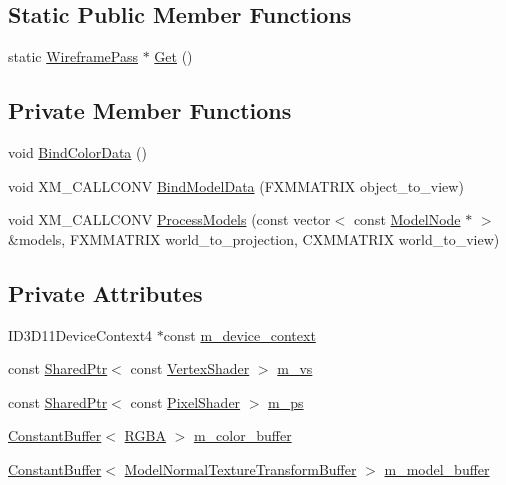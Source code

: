 \subsection*{Static Public Member Functions}
\begin{DoxyCompactItemize}
\item 
static \hyperlink{classmage_1_1_wireframe_pass}{Wireframe\+Pass} $\ast$ \hyperlink{classmage_1_1_wireframe_pass_ace5168eac9d32c1bfa71df3411960f48}{Get} ()
\end{DoxyCompactItemize}
\subsection*{Private Member Functions}
\begin{DoxyCompactItemize}
\item 
void \hyperlink{classmage_1_1_wireframe_pass_a574897c1274585057e8d44070409b7e3}{Bind\+Color\+Data} ()
\item 
void X\+M\+\_\+\+C\+A\+L\+L\+C\+O\+NV \hyperlink{classmage_1_1_wireframe_pass_a6e316eaabf3afb71162490c1f3c244f3}{Bind\+Model\+Data} (F\+X\+M\+M\+A\+T\+R\+IX object\+\_\+to\+\_\+view)
\item 
void X\+M\+\_\+\+C\+A\+L\+L\+C\+O\+NV \hyperlink{classmage_1_1_wireframe_pass_a190f6a6a916949b6b37d5b70c9451008}{Process\+Models} (const vector$<$ const \hyperlink{classmage_1_1_model_node}{Model\+Node} $\ast$ $>$ \&models, F\+X\+M\+M\+A\+T\+R\+IX world\+\_\+to\+\_\+projection, C\+X\+M\+M\+A\+T\+R\+IX world\+\_\+to\+\_\+view)
\end{DoxyCompactItemize}
\subsection*{Private Attributes}
\begin{DoxyCompactItemize}
\item 
I\+D3\+D11\+Device\+Context4 $\ast$const \hyperlink{classmage_1_1_wireframe_pass_ac0f6bc1488ab515fe00d6e7abf230636}{m\+\_\+device\+\_\+context}
\item 
const \hyperlink{namespacemage_a1e01ae66713838a7a67d30e44c67703e}{Shared\+Ptr}$<$ const \hyperlink{classmage_1_1_vertex_shader}{Vertex\+Shader} $>$ \hyperlink{classmage_1_1_wireframe_pass_aa55de3b804055362812bcf775e0dffb4}{m\+\_\+vs}
\item 
const \hyperlink{namespacemage_a1e01ae66713838a7a67d30e44c67703e}{Shared\+Ptr}$<$ const \hyperlink{namespacemage_a27ecaf266420ee7a494d64edc0757129}{Pixel\+Shader} $>$ \hyperlink{classmage_1_1_wireframe_pass_a39577f12ad9b3f72e703c290cbf46002}{m\+\_\+ps}
\item 
\hyperlink{structmage_1_1_constant_buffer}{Constant\+Buffer}$<$ \hyperlink{structmage_1_1_r_g_b_a}{R\+G\+BA} $>$ \hyperlink{classmage_1_1_wireframe_pass_acb2aaf33841a4f08edb50f9b72637d93}{m\+\_\+color\+\_\+buffer}
\item 
\hyperlink{structmage_1_1_constant_buffer}{Constant\+Buffer}$<$ \hyperlink{structmage_1_1_model_normal_texture_transform_buffer}{Model\+Normal\+Texture\+Transform\+Buffer} $>$ \hyperlink{classmage_1_1_wireframe_pass_aa7fb7cbba08fe8b4d7defab36d2e82a7}{m\+\_\+model\+\_\+buffer}
\end{DoxyCompactItemize}


